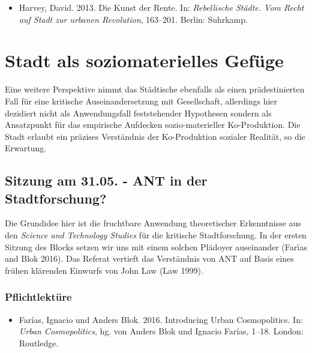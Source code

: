 \documentclass[
]{article}
\providecommand{\tightlist}{%
  \setlength{\itemsep}{0pt}\setlength{\parskip}{0pt}}
\begin{document}
\begin{itemize}
\tightlist
\item
  Harvey, David. 2013. Die Kunst der Rente. In: \emph{Rebellische Städte. Vom Recht auf Stadt zur urbanen Revolution}, 163--201. Berlin: Suhrkamp.
\end{itemize}

\pagebreak

\hypertarget{stadt-als-soziomaterielles-gefuxfcge}{%
\section{Stadt als soziomaterielles Gefüge}\label{stadt-als-soziomaterielles-gefuxfcge}}

Eine weitere Perspektive nimmt das Städtische ebenfalls als einen prädestinierten Fall für eine kritische Auseinandersetzung mit Gesellschaft, allerdings hier dezidiert nicht als Anwendungsfall feststehender Hypothesen sondern als Ansatzpunkt für das empirische Aufdecken sozio-materieller Ko-Produktion. Die Stadt erlaubt ein präzises Verständnis der Ko-Produktion sozialer Realität, so die Erwartung.

\hypertarget{sitzung-am-31.05.---ant-in-der-stadtforschung}{%
\subsection{Sitzung am 31.05. - ANT in der Stadtforschung?}\label{sitzung-am-31.05.---ant-in-der-stadtforschung}}

Die Grundidee hier ist die fruchtbare Anwendung theoretischer Erkenntnisse aus den \emph{Science and Technology Studies} für die kritische Stadtforschung. In der ersten Sitzung des Blocks setzen wir uns mit einem solchen Plädoyer auseinander (Farı́as and Blok 2016). Das Referat vertieft das Verständnis von ANT auf Basis eines frühen klärenden Einwurfs von John Law (Law 1999).

\hypertarget{pflichtlektuxfcre-5}{%
\subsubsection*{Pflichtlektüre}\label{pflichtlektuxfcre-5}}

\begin{itemize}
\tightlist
\item
  Farías, Ignacio und Anders Blok. 2016. Introducing Urban Cosmopolitics. In: \emph{Urban Cosmopolitics}, hg. von Anders Blok und Ignacio Farías, 1--18. London: Routledge.
\end{itemize}
\end{document}
